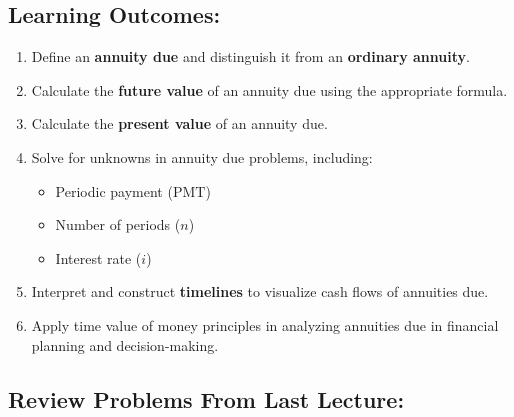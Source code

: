 \documentclass[
]{book}
\providecommand{\tightlist}{%
  \setlength{\itemsep}{0pt}\setlength{\parskip}{0pt}}
\begin{document}
\subsection*{Learning Outcomes:}\label{learning-outcomes-16}

\begin{enumerate}
\def\labelenumi{\arabic{enumi}.}
\tightlist
\item
  Define an \textbf{annuity due} and distinguish it from an \textbf{ordinary annuity}.
\item
  Calculate the \textbf{future value} of an annuity due using the appropriate formula.
\item
  Calculate the \textbf{present value} of an annuity due.
\item
  Solve for unknowns in annuity due problems, including:

  \begin{itemize}
  \tightlist
  \item
    Periodic payment (\(\text{PMT}\))
  \item
    Number of periods (\(n\))
  \item
    Interest rate (\(i\))
  \end{itemize}
\item
  Interpret and construct \textbf{timelines} to visualize cash flows of annuities due.
\item
  Apply time value of money principles in analyzing annuities due in financial planning and decision-making.
\end{enumerate}

\subsection*{Review Problems From Last Lecture:}\label{review-problems-from-last-lecture-15}
\end{document}
